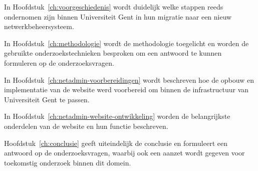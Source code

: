 In Hoofdstuk~\ref{ch:voorgeschiedenis} wordt duidelijk welke stappen reeds ondernomen zijn binnen Universiteit Gent in hun migratie naar een nieuw netwerkbeheersysteem.

In Hoofdstuk~\ref{ch:methodologie} wordt de methodologie toegelicht en worden de gebruikte onderzoekstechnieken besproken om een antwoord te kunnen formuleren op de onderzoeksvragen.

In Hoofdstuk~\ref{ch:netadmin-voorbereidingen} wordt beschreven hoe de opbouw en implementatie van de website werd voorbereid om binnen de infrastructuur van Universiteit Gent te passen.

In Hoofdstuk~\ref{ch:netadmin-website-ontwikkeling} worden de belangrijkste onderdelen van de website en hun functie beschreven.

Hoofdstuk~\ref{ch:conclusie} geeft uiteindelijk de conclusie en formuleert een antwoord op de onderzoeksvragen, waarbij ook een aanzet wordt gegeven voor toekomstig onderzoek binnen dit domein.